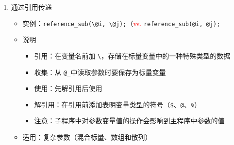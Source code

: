 \documentclass{TIJMUjiaoanLL}
\begin{document}
\begin{enumerate}
\begin{enumerate}
\begin{itemize}
	\end{itemize}
      \item 通过引用传递
	\begin{itemize}
	  \item 实例：\verb|reference_sub(\@i, \@j);|（\textcolor{red}{vs.} \verb|reference_sub(@i, @j);|
	  \item 说明
	    \begin{itemize}
	      \item 引用：在变量名前加 \verb|\|，存储在标量变量中的一种特殊类型的数据
	      \item 收集：从 \verb|@_|中读取参数时要保存为标量变量
	      \item 使用：先解引用后使用
	      \item 解引用：在引用前添加表明变量类型的符号（\verb|$|、\verb|@|、\verb|%|）
	      \item 注意：子程序中对参数变量值的操作会影响到主程序中参数的值
	    \end{itemize}
	  \item 适用：复杂参数（混合标量、数组和散列）
	\end{itemize}
    \end{enumerate}

\otherTail
\newpage
\otherHeader


\end{enumerate}
\end{document}
